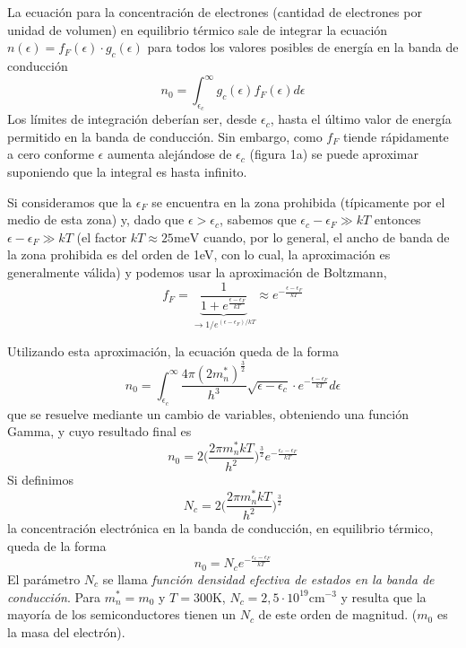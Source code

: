 \documentclass[12pt,a4paper]{article}
\begin{document}
La ecuación para la concentración de electrones (cantidad de electrones por unidad de volumen) en equilibrio térmico sale de integrar la ecuación $n(\epsilon)=f_{F}(\epsilon) \cdot g_{c}(\epsilon)$ para todos los valores posibles de energía en la banda de conducción
\[ n_{0} = \int_{\epsilon _{c}}^{\infty} g_{c}(\epsilon) f_{F}(\epsilon) d\epsilon \]
Los límites de integración deberían ser, desde $\epsilon _{c}$, hasta el último valor de energía permitido en la banda de conducción. Sin embargo, como $f_{F}$ tiende rápidamente a cero conforme $\epsilon$ aumenta alejándose de $\epsilon _{c}$ (figura 1a) se puede aproximar suponiendo que la integral es hasta infinito.

Si consideramos que la $\epsilon _{F}$ se encuentra en la zona prohibida (típicamente por el medio de esta zona) y, dado que $\epsilon > \epsilon _{c}$, sabemos que $\epsilon _{c} - \epsilon _{F} \gg kT$ entonces $\epsilon - \epsilon _{F} \gg kT$ (el factor $kT \approx 25\textrm{meV}$ cuando, por lo general, el ancho de banda de la zona prohibida es del orden de 1eV, con lo cual, la aproximación es generalmente válida) y podemos usar la aproximación de Boltzmann,
\[ f_{F} =\underbrace{ \frac{1}{1+e^{\frac{\epsilon - \epsilon _{F}}{kT}}} }_{ \rightarrow 1/e^{(\epsilon - \epsilon _{F})/kT} } \approx e^{-\frac{\epsilon - \epsilon _{F}}{kT}} \]

Utilizando esta aproximación, la ecuación queda de la forma
\[ n_{0} = \int _{\epsilon _{c}}^{\infty} \frac{4 \pi (2m_{n}^{\ast})^{\frac{3}{2}}}{h^{3}} \sqrt{\epsilon - \epsilon _{c}} \cdot e^{-\frac{\epsilon - \epsilon _{F}}{kT}} d\epsilon \]
que se resuelve mediante un cambio de variables, obteniendo una función Gamma, y cuyo resultado final es
\[ n_{0} = 2 \bigg( \frac{2 \pi m_{n}^{\ast}kT}{h^{2}} \bigg)^{\frac{3}{2}} e^{-\frac{\epsilon _{c} - \epsilon _{F}}{kT}} \]
Si definimos
\[ N_{c} = 2 \bigg( \frac{2 \pi m_{n}^{\ast}kT}{h^{2}} \bigg)^{\frac{3}{2}} \]
la concentración electrónica en la banda de conducción, en equilibrio térmico, queda de la forma
\[ n_{0} = N_{c} e^{-\frac{\epsilon _{c} - \epsilon _{F}}{kT}} \]
El parámetro $N_{c}$ se llama \emph{función densidad efectiva de estados en la banda de conducción}. Para $m_{n}^{\ast}=m_{0}$ y $T=300$K, $N_{c}=2,5 \cdot 10^{19} \textrm{cm}^{-3}$ y resulta que la mayoría de los semiconductores tienen un $N_{c}$ de este orden de magnitud. ($m_{0}$ es la masa del electrón).
\end{document}
